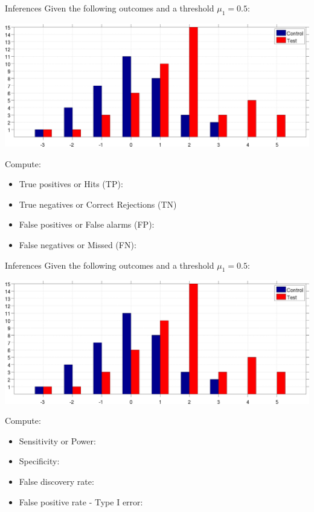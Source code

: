 \documentclass{beamer}
\begin{document}
\begin{frame}{Inferences}
  Given the following outcomes and a threshold $\mu_{1} = 0.5$:

  \begin{center}
    \includegraphics[scale=0.055]{./Control_Test.jpg}
  \end{center}

  Compute:
  \begin{itemize}
    \item True positives or Hits (TP):
    \item True negatives or Correct Rejections (TN)
    \item False positives or False alarms (FP):
    \item False negatives or Missed (FN):
  \end{itemize}
\end{frame}


\begin{frame}{Inferences}
  Given the following outcomes and a threshold $\mu_{1} = 0.5$:

  \begin{center}
    \includegraphics[scale=0.055]{./Control_Test.jpg}
  \end{center}

  Compute:
  \begin{itemize}
    \item Sensitivity or Power: %
    \item Specificity: %
    \item False discovery rate: %
    \item False positive rate - Type I error: %
  \end{itemize}
\end{frame}
\end{document}
